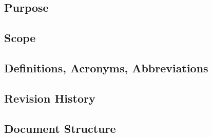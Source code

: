 \subsection{Purpose}
\subsection{Scope}
\subsection{Definitions, Acronyms, Abbreviations}
\subsection{Revision History}
\subsection{Document Structure}